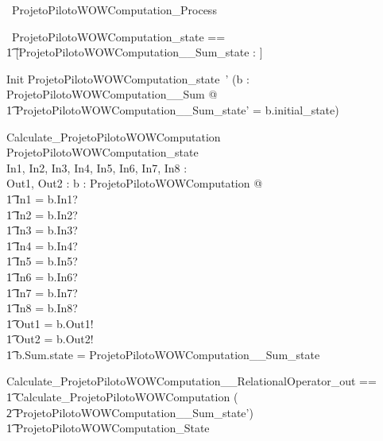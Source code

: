 \documentclass{article}
\begin{document}
\begin{circus}
  \circprocess\ ProjetoPilotoWOWComputation\_Process \circdef \circbegin
\end{circus}
\vspace{-2.8em}

\begin{circusaction}
  \circstate\ ProjetoPilotoWOWComputation\_state ==\\
    \t1 [ProjetoPilotoWOWComputation\_\_Sum\_state : \nat]
\end{circusaction}
\vspace{-2.8em}

\begin{schema}{Init}
  ProjetoPilotoWOWComputation\_state~'
\where
  (\exists b : ProjetoPilotoWOWComputation\_\_Sum @\\
    \t1 ProjetoPilotoWOWComputation\_\_Sum\_state' = b.initial\_state)
\end{schema}
\vspace{-2.8em}

\begin{schema}{Calculate\_ProjetoPilotoWOWComputation}
  \Delta ProjetoPilotoWOWComputation\_state\\
  In1, In2, In3, In4, In5, In6, In7, In8 : \nat\\
  Out1, Out2 : \nat
\where
  \exists b : ProjetoPilotoWOWComputation @\\
    \t1 In1 = b.In1? \land\\
    \t1 In2 = b.In2? \land\\
    \t1 In3 = b.In3? \land\\
    \t1 In4 = b.In4? \land\\
    \t1 In5 = b.In5? \land\\
    \t1 In6 = b.In6? \land\\
    \t1 In7 = b.In7? \land\\
    \t1 In8 = b.In8? \land\\
    \t1 Out1 = b.Out1! \land\\
    \t1 Out2 = b.Out2! \land\\
    \t1 b.Sum.state = ProjetoPilotoWOWComputation\_\_Sum\_state
\end{schema}
\vspace{-2.8em}

\begin{circusaction}
  Calculate\_ProjetoPilotoWOWComputation\_\_RelationalOperator\_out ==\\
    \t1 Calculate\_ProjetoPilotoWOWComputation \hide (\\
      \t2 ProjetoPilotoWOWComputation\_\_Sum\_state')\\
    \t1 \land \Xi ProjetoPilotoWOWComputation\_State
\end{circusaction}
\vspace{-2.8em}
\end{document}
